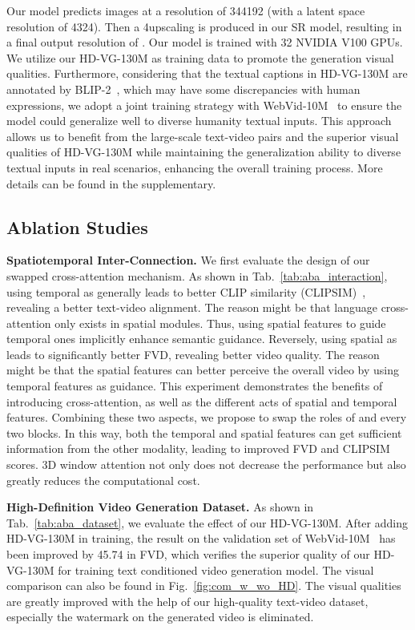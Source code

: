 \documentclass{article}
\begin{document}
Our model predicts images at a resolution of 344192 (with a latent space resolution of 4324). Then a 4upscaling is produced in our SR model, resulting in a final output resolution of .
Our model is trained with 32 NVIDIA V100 GPUs.
We utilize our HD-VG-130M as training data to promote the generation visual qualities. Furthermore, considering that the textual captions in HD-VG-130M are annotated by BLIP-2~\cite{li2023blip}, which may have some discrepancies with human expressions, we adopt a joint training strategy with WebVid-10M~\cite{bain2021frozen} to ensure the model could generalize well to diverse humanity textual inputs. 
This approach allows us to benefit from the large-scale text-video pairs and the superior visual qualities of HD-VG-130M while maintaining the generalization ability to diverse textual inputs in real scenarios, enhancing the overall training process.
More details can be found in the supplementary.



\subsection{Ablation Studies}


\noindent\textbf{Spatiotemporal Inter-Connection.}
We first evaluate the design of our swapped cross-attention mechanism. 
As shown in Tab.~\ref{tab:aba_interaction}, using temporal as  generally leads to better CLIP similarity (CLIPSIM)~\cite{CLIP}, revealing a better text-video alignment.
The reason might be that language cross-attention only exists in spatial modules. Thus, using spatial features to guide temporal ones implicitly enhance semantic guidance.
Reversely, using spatial as  leads to significantly better FVD, revealing better video quality. The reason might be that the spatial features can better perceive the overall video by using temporal features as guidance.
This experiment demonstrates the benefits of introducing cross-attention, as well as the different acts of spatial and temporal features.
Combining these two aspects, we propose to swap the roles of  and  every two blocks.
In this way, both the temporal and spatial features can get sufficient information from the other modality, leading to improved FVD and CLIPSIM scores.
3D window attention not only does not decrease the performance but also greatly reduces the computational cost.

\noindent\textbf{High-Definition Video Generation Dataset.}
As shown in Tab.~\ref{tab:aba_dataset}, we evaluate the effect of our HD-VG-130M. After adding HD-VG-130M in training, the result on the validation set of WebVid-10M~\cite{bain2021frozen} has been improved by 45.74 in FVD, which verifies the superior quality of our HD-VG-130M for training text conditioned video generation model. The visual comparison can also be found in Fig.~\ref{fig:com_w_wo_HD}. The visual qualities are greatly improved with the help of our high-quality text-video dataset, especially the watermark on the generated video is eliminated.
\end{document}
